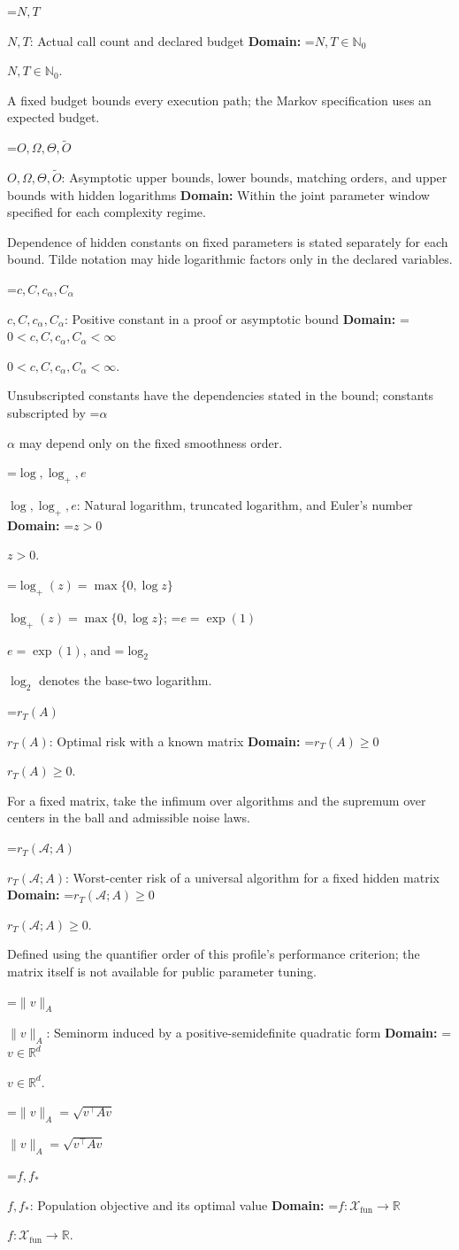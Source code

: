 \documentclass[10pt,a4paper]{article}
\newcommand{\AtlasMath}[1]{\par\begingroup\centering\setbox0=\hbox{$\displaystyle #1$}\ifdim\wd0>1.4\linewidth\typeout{ATLAS WIDE FORMULA: \the\wd0}\fi\ifdim\wd0>\linewidth\resizebox{\linewidth}{!}{\box0}\else\box0\fi\par\endgroup}
\newcommand{\AtlasInlineMath}[1]{\begingroup\setbox0=\hbox{$#1$}\ifdim\wd0>.4\linewidth\endgroup\AtlasMath{#1}\else\endgroup$#1$\fi}
\begin{document}
\AtlasInlineMath{N,T}: Actual call count and declared budget \textbf{Domain:} \AtlasInlineMath{N,T\in\mathbb{N}_0}.

A fixed budget bounds every execution path; the Markov specification uses an expected budget.

\AtlasInlineMath{O,\Omega,\Theta,\widetilde{O}}: Asymptotic upper bounds, lower bounds, matching orders, and upper bounds with hidden logarithms \textbf{Domain:} Within the joint parameter window specified for each complexity regime.

Dependence of hidden constants on fixed parameters is stated separately for each bound. Tilde notation may hide logarithmic factors only in the declared variables.

\AtlasInlineMath{c,C,c_\alpha,C_\alpha}: Positive constant in a proof or asymptotic bound \textbf{Domain:} \AtlasInlineMath{0<c,C,c_\alpha,C_\alpha<\infty}.

Unsubscripted constants have the dependencies stated in the bound; constants subscripted by \AtlasInlineMath{\alpha} may depend only on the fixed smoothness order.

\AtlasInlineMath{\log,\log_+,e}: Natural logarithm, truncated logarithm, and Euler's number \textbf{Domain:} \AtlasInlineMath{z>0}.

\AtlasInlineMath{\log_+(z)=\max\{0,\log z\}}; \AtlasInlineMath{e=\exp(1)}, and \AtlasInlineMath{\log_2} denotes the base-two logarithm.

\AtlasInlineMath{r_T(A)}: Optimal risk with a known matrix \textbf{Domain:} \AtlasInlineMath{r_T(A)\ge0}.

For a fixed matrix, take the infimum over algorithms and the supremum over centers in the ball and admissible noise laws.

\AtlasInlineMath{r_T(\mathcal{A};A)}: Worst-center risk of a universal algorithm for a fixed hidden matrix \textbf{Domain:} \AtlasInlineMath{r_T(\mathcal{A};A)\ge0}.

Defined using the quantifier order of this profile's performance criterion; the matrix itself is not available for public parameter tuning.

\AtlasInlineMath{\|v\|_A}: Seminorm induced by a positive-semidefinite quadratic form \textbf{Domain:} \AtlasInlineMath{v\in\mathbb{R}^d}.

\AtlasInlineMath{\|v\|_A=\sqrt{v^\top Av}}

\AtlasInlineMath{f,f_*}: Population objective and its optimal value \textbf{Domain:} \AtlasInlineMath{f:\mathcal{X}_{\mathrm{fun}}\to\mathbb{R}}.
\end{document}
